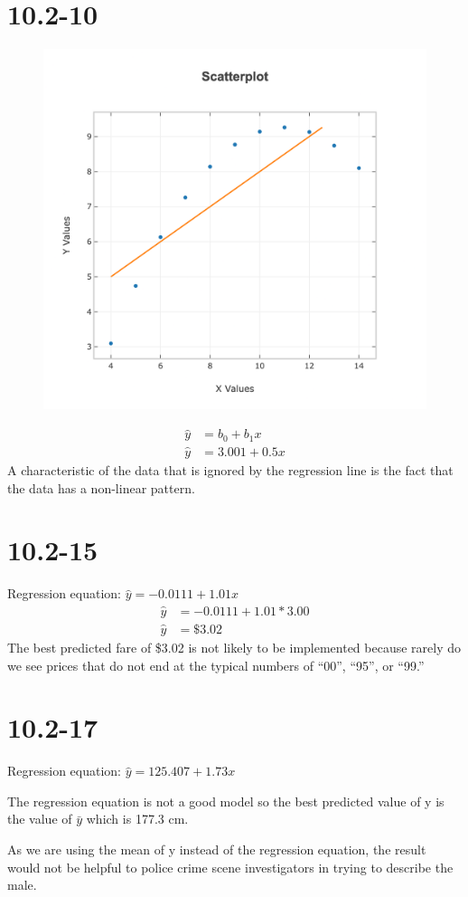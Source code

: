 \documentclass[12pt,fleqn]{article}
\newcommand{\problemtentwo}[1]{\vspace{5ex}\section*{10.2-#1}}
\begin{document}
\pagebreak
\problemtentwo{10}
\begin{figure}[ht]
  \centering
  \includegraphics[width=12cm]{assets/scatterplot-3.png}
\end{figure}

\begin{align*}
  \hat{y} &= b_0 + b_1x \\
  \hat{y} &= 3.001 + 0.5x
\end{align*}
A characteristic of the data that is ignored by the regression line is the fact that the data has a non-linear pattern.


\problemtentwo{15}
Regression equation: $\hat{y} = -0.0111 + 1.01x$
\begin{align*}
  \hat{y} &= -0.0111 + 1.01 * 3.00 \\
  \hat{y} &= \$3.02
\end{align*}
The best predicted fare of \$3.02 is not likely to be implemented because rarely do we see prices that do not end at the typical numbers of ``00'', ``95'', or ``99.''


\problemtentwo{17}
Regression equation: $\hat{y} = 125.407 + 1.73x$

The regression equation is not a good model so the best predicted value of y is the value of $\bar{y}$ which is 177.3 cm.

As we are using the mean of y instead of the regression equation, the result would not be helpful to police crime scene investigators in trying to describe the male.
\end{document}
